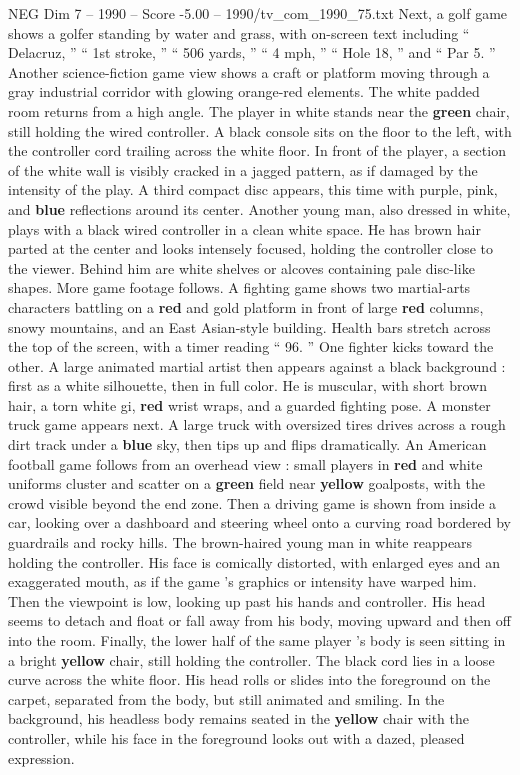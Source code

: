 \begin{textsample}{NEG Dim 7 – 1990 – Score -5.00 – 1990/tv\_com\_1990\_75.txt}
Next, a golf game shows a golfer standing by water and grass, with on-screen text including “ Delacruz, ” “ 1st stroke, ” “ 506 yards, ” “ 4 mph, ” “ Hole 18, ” and “ Par 5. ” Another science-fiction game view shows a craft or platform moving through a gray industrial corridor with glowing orange-red elements.
The white padded room returns from a high angle.
The player in white stands near the \textbf{green} chair, still holding the wired controller.
A black console sits on the floor to the left, with the controller cord trailing across the white floor.
In front of the player, a section of the white wall is visibly cracked in a jagged pattern, as if damaged by the intensity of the play.
A third compact disc appears, this time with purple, pink, and \textbf{blue} reflections around its center.
Another young man, also dressed in white, plays with a black wired controller in a clean white space.
He has brown hair parted at the center and looks intensely focused, holding the controller close to the viewer.
Behind him are white shelves or alcoves containing pale disc-like shapes.
More game footage follows.
A fighting game shows two martial-arts characters battling on a \textbf{red} and gold platform in front of large \textbf{red} columns, snowy mountains, and an East Asian-style building.
Health bars stretch across the top of the screen, with a timer reading “ 96. ” One fighter kicks toward the other.
A large animated martial artist then appears against a black background : first as a white silhouette, then in full color.
He is muscular, with short brown hair, a torn white gi, \textbf{red} wrist wraps, and a guarded fighting pose.
A monster truck game appears next.
A large truck with oversized tires drives across a rough dirt track under a \textbf{blue} sky, then tips up and flips dramatically.
An American football game follows from an overhead view : small players in \textbf{red} and white uniforms cluster and scatter on a \textbf{green} field near \textbf{yellow} goalposts, with the crowd visible beyond the end zone.
Then a driving game is shown from inside a car, looking over a dashboard and steering wheel onto a curving road bordered by guardrails and rocky hills.
The brown-haired young man in white reappears holding the controller.
His face is comically distorted, with enlarged eyes and an exaggerated mouth, as if the game ’s graphics or intensity have warped him.
Then the viewpoint is low, looking up past his hands and controller.
His head seems to detach and float or fall away from his body, moving upward and then off into the room.
Finally, the lower half of the same player ’s body is seen sitting in a bright \textbf{yellow} chair, still holding the controller.
The black cord lies in a loose curve across the white floor.
His head rolls or slides into the foreground on the carpet, separated from the body, but still animated and smiling.
In the background, his headless body remains seated in the \textbf{yellow} chair with the controller, while his face in the foreground looks out with a dazed, pleased expression.

\end{textsample}
